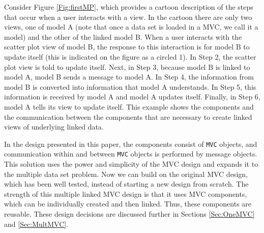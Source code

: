 \documentclass{article}[11pt]
\newcommand{\Robject}[1]{{\texttt{#1}}}
\begin{document}
Consider Figure \ref{Fig:firstMP}, which provides a cartoon
description of the steps that occur when a user interacts with a
view.  In the cartoon there are only two views, one of model A (note 
that once a data set is loaded in a MVC, we call it a model) and the
other of the linked model B.  When a user interacts with the scatter plot view
of model B, the response to this interaction is for model B to update itself
(this is indicated on the figure as a circled 1).  In Step 2, the scatter plot
view is told to update itself.  Next, in Step 3, because model B is linked
to model A, model B sends a message to model A.  In Step 4,
the information from model B is converted into information that
model A understands.  In Step 5, this information is received by
model A and model A updates itself.  Finally, in Step 6, model
A tells its view to update itself.  This example shows the components
and the communication between the components that are necessary to create
linked views of underlying linked data.  

In the design presented in this paper, the components consist of \Robject{MVC}
objects, and communication within and between \Robject{MVC} objects is
performed by message objects.  This solution uses the power and simplicity of
the MVC design and expands it to the multiple data set problem.  Now we can
build on the original MVC design, which has been well tested, instead of
starting a new design from scratch.  The strength of this multiple linked MVC
design is that it uses MVC components, which can be individually created and
then linked.  Thus, these components are reusable.  These design decisions are
discussed further in Sections \ref{Sec:OneMVC} and \ref{Sec:MultMVC}. 
\end{document}
